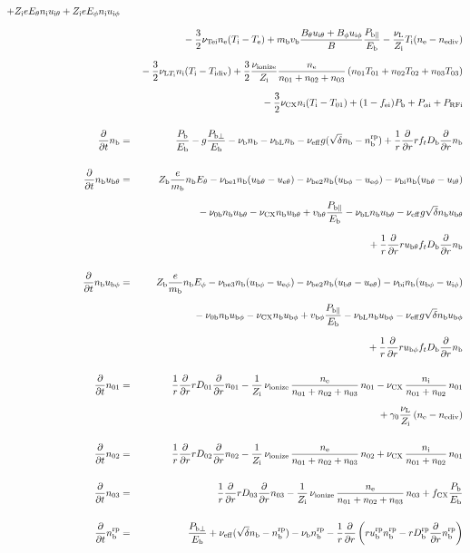 \documentclass[11pt]{article}
\def\r#1{{\rm#1}}
\def\ddt{\frac{\partial}{\partial t}}
\def\ddr{\frac{\partial}{\partial r}}
\def\mb{m_\r{b}}
\def\nee{n_\r{e}}
\def\ni{n_\r{i}}
\def\nb{n_\r{b}}
\def\ueth{u_{\r{e}\theta}}
\def\uith{u_{\r{i}\theta}}
\def\ubth{u_{\r{b}\theta}}
\def\ueph{u_{\r{e}\phi}}
\def\uiph{u_{\r{i}\phi}}
\def\ubph{u_{\r{b}\phi}}
\def\Eth{E_\theta}
\def\Eph{E_\phi}
\def\Bth{B_\theta}
\def\Bph{B_\phi}
\def\Te{T_\r{e}}
\def\Ti{T_\r{i}}
\def\nna{n_{01}}
\def\nnb{n_{02}}
\def\nnc{n_{03}}
\def\Zi{Z_\r{i}}
\def\Zb{Z_\r{b}}
\def\Pb{P_\r{b}}
\def\Eb{E_\r{b}}
\def\PRFi{P_\r{RFi}}
\def\Tna{T_{01}}
\def\Tnb{T_{02}}
\def\Tnc{T_{03}}
\def\fei{f_\r{ei}}
\def\nbrp{n_\r{b}^\r{rp}}
\def\Pbpara{P_{\r{b}\parallel}}
\def\Pbperp{P_{\r{b}\perp}}
\def\nueff{\nu_\r{eff}}
\def\ubrp{u_\r{b}^\r{rp}}
\def\Dbrp{D_\r{b}^\r{rp}}
\def\Db{D_\r{b}}
\def\fCX{f_\r{CX}}
\def\Palpi{P_{\alpha\r{i}}}
\def\nuNCi{\nu_\r{NCi}}
\def\nubi{\nu_\r{bi}}
\def\nunb{\nu_\r{0b}}
\def\nuL{\nu_\r{L}}
\def\nuCX{\nu_\r{CX}}
\def\nuion{\nu_\r{ionize}}
\def\nub{\nu_\r{b}}
\def\nuTei{\nu_\r{Tei}}
\def\vb{v_\r{b}}
\def\nediv{n_\r{ediv}}
\def\Tidiv{T_\r{idiv}}
\def\nuLTi{\nu_{\r{L}T_\r{i}}}
\def\nubL{\nu_\r{bL}}
\def\vbph{v_{\r{b}\phi}}
\def\vbth{v_{\r{b}\theta}}
\begin{document}
\begin{eqnarray}
%
  + \Zi e \Eth \ni \uith
%
  + \Zi e \Eph \ni \uiph
\nonumber\\[2.5mm]&&{}
%
  - \frac{3}{2} \nuTei \nee (\Ti - \Te)
%
  + \mb \vb \frac{\Bth \uith + \Bph \uiph}{B} \frac{\Pbpara}{\Eb}
%
  - \frac{\nuL}{\Zi} \Ti (\nee - \nediv)
\nonumber\\[2.5mm]&&{}
%
  - \frac{3}{2} \nuLTi \ni (\Ti - \Tidiv)
%
  + \frac{3}{2} \frac{\nuion}{\Zi} \frac{\nee}{\nna + \nnb + \nnc}\, (\nna \Tna +
  \nnb \Tnb + \nnc \Tnc)
\nonumber\\[2.5mm]&&{}
%
  - \frac{3}{2} \nuCX \ni (\Ti - \Tna)
%
  + (1 - \fei) \Pb
%
  + \Palpi
%
  + \PRFi
\\[5mm]
  \ddt \nb &=&
%
    \frac{\Pb}{\Eb}
%
  - g \frac{\Pbperp}{\Eb}
%
  - \nub \nb
%
  - \nubL \nb
%
  - \nueff g (\sqrt{\delta} \nb - \nbrp)
%
  + \frac{1}{r} \ddr r f_t \Db \ddr \nb
\\[5mm]
  \ddt \nb \ubth &=&
%
    \Zb \frac{e}{\mb} \nb \Eth
%
%
  - \nu_\r{be1} \nb (\ubth - \ueth)
%
  - \nu_\r{be2} \nb (\ubph - \ueph)
%
  - \nubi \nb (\ubth - \uith)
\nonumber\\[2.5mm]&&{}
%
  - \nunb \nb \ubth
%
  - \nuCX \nb \ubth
%
  + \vbth \frac{\Pbpara}{\Eb}
%
  - \nubL \nb \ubth
%
  - \nueff g \sqrt{\delta} \nb \ubth
\nonumber\\[2.5mm]&&{}
%
  + \frac{1}{r} \ddr r \ubth f_t \Db \ddr \nb
\\[5mm]
  \ddt \nb \ubph &=&
%
  \Zb \frac{e}{\mb} \nb \Eph
%
  - \nu_\r{be3} \nb (\ubph - \ueph)
%
  - \nu_\r{be2} \nb (\ubth - \ueth)
%
  - \nubi \nb (\ubph - \uiph)
\nonumber\\[2.5mm]&&{}
%
  - \nunb \nb \ubph
%
  - \nuCX \nb \ubph
%
  + \vbph \frac{\Pbpara}{\Eb}
%
  - \nubL \nb \ubph
%
  - \nueff g \sqrt{\delta} \nb \ubph
\nonumber\\[2.5mm]&&{}
%
  + \frac{1}{r} \ddr r \ubph f_t \Db \ddr \nb
\\[5mm]
  \ddt \nna &=& 
%
    \frac{1}{r} \ddr r D_{01} \ddr \nna
%
  - \frac{1}{\Zi}\, \nuion\, \frac{\nee}{\nna + \nnb + \nnc}\, \nna
%
  - \nuCX\, \frac{\ni}{\nna + \nnb}\, \nna
\nonumber\\[2.5mm]&&{}
%
  + \gamma_0 \frac{\nuL}{\Zi} \, (\nee - \nediv)
\\[5mm]
  \ddt \nnb &=& 
%
    \frac{1}{r} \ddr r D_{02} \ddr \nnb
%
  - \frac{1}{\Zi}\, \nuion\, \frac{\nee}{\nna + \nnb + \nnc}\, \nnb
%
  + \nuCX\, \frac{\ni}{\nna + \nnb}\, \nna
%
\\[5mm]
  \ddt \nnc &=& 
%
    \frac{1}{r} \ddr r D_{03} \ddr \nnc
%
  - \frac{1}{\Zi}\, \nuion\, \frac{\nee}{\nna + \nnb + \nnc}\, \nnc
%
  + \fCX \frac{\Pb}{\Eb}
\\[5mm]
  \ddt \nbrp &=&
%
    \frac{\Pbperp}{\Eb}
%
  + \nueff (\sqrt{\delta} \nb - \nbrp)
%
  - \nub \nbrp
%
  - \frac{1}{r} \ddr \left( r \ubrp \nbrp - r \Dbrp \ddr \nbrp \right)
%
\end{eqnarray}
\end{document}
